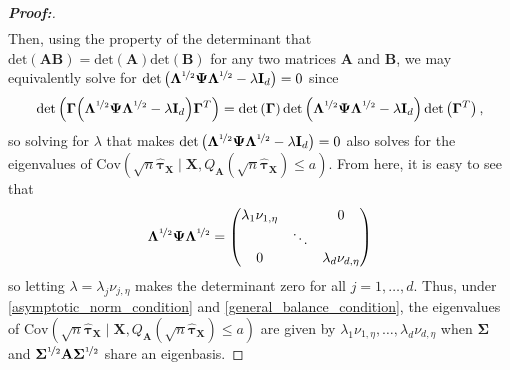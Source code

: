 \documentclass[11pt,twoside]{article}
\theoremstyle{definition}
\theoremstyle{remark}
\begin{document}
\begin{proof}[\textbf{Proof:}]
\begin{align*}
    \end{align*}
Then, using the property of the determinant that $\text{det}(\mathbf{A} \mathbf{B}) = \text{det}(\mathbf{A}) \text{det}(\mathbf{B})$ for any two matrices $\mathbf{A}$ and $\mathbf{B}$, we may equivalently solve for $\text{det}\left(  \mathbf{\Lambda}^{\nicefrac{1}{2}} \mathbf{\Psi} \mathbf{\Lambda}^{\nicefrac{1}{2}}  - \lambda \mathbf{I}_d \right) = 0$ since
    \begin{align*}
        \text{det}\left(\mathbf{\Gamma} \Big(  \mathbf{\Lambda}^{\nicefrac{1}{2}} \mathbf{\Psi} \mathbf{\Lambda}^{\nicefrac{1}{2}}  - \lambda \mathbf{I}_d \Big) \mathbf{\Gamma}^T \right) = \text{det}\left(\mathbf{\Gamma} \right) \text{det}\left(  \mathbf{\Lambda}^{\nicefrac{1}{2}} \mathbf{\Psi} \mathbf{\Lambda}^{\nicefrac{1}{2}}  - \lambda \mathbf{I}_d \right) \text{det}\left( \mathbf{\Gamma}^T \right), 
    \end{align*}
    so solving for $\lambda$ that makes $\text{det}\left(  \mathbf{\Lambda}^{\nicefrac{1}{2}} \mathbf{\Psi} \mathbf{\Lambda}^{\nicefrac{1}{2}}  - \lambda \mathbf{I}_d \right) = 0$ also solves for the eigenvalues of $\text{Cov}\left(\sqrt{n}\widehat{\bm{\tau}}_{\mathbf{X}} \mid \mathbf{X}, Q_{\mathbf{A}}(\sqrt{n} \widehat{\bm{\tau}}_{\mathbf{X}}) \leq a \right)$. From here, it is easy to see that
    \begin{align*}
        \mathbf{\Lambda}^{\nicefrac{1}{2}} \mathbf{\Psi} \mathbf{\Lambda}^{\nicefrac{1}{2}} = \begin{pmatrix}
            \lambda_1 \nu_{1, \eta} & & 0\\
            & \ddots & \\
           0 & & \lambda_d \nu_{d, \eta}
        \end{pmatrix}
    \end{align*}
    so letting $\lambda = \lambda_j \nu_{j, \eta}$ makes the determinant zero for all $j = 1, \ldots, d$. Thus, under \cref{asymptotic_norm_condition} and \cref{general_balance_condition}, the eigenvalues of $\text{Cov}\left(\sqrt{n}\widehat{\bm{\tau}}_{\mathbf{X}} \mid \mathbf{X}, Q_{\mathbf{A}}(\sqrt{n} \widehat{\bm{\tau}}_{\mathbf{X}}) \leq a \right)$ are given by $\lambda_1 \nu_{1, \eta}, \ldots, \lambda_d \nu_{d, \eta}$ when $\mathbf{\Sigma}$ and $\mathbf{\Sigma}^{\nicefrac{1}{2}} \mathbf{A} \mathbf{\Sigma}^{\nicefrac{1}{2}}$ share an eigenbasis.
\end{proof}
\end{document}
